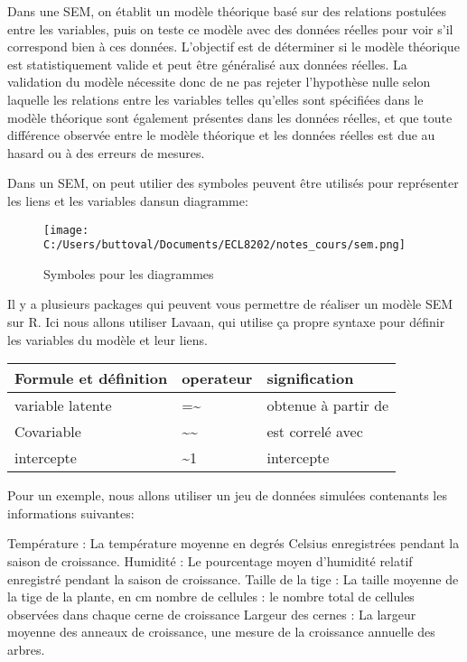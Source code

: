 \documentclass[
]{article}
\begin{document}
Dans une SEM, on établit un modèle théorique basé sur des relations
postulées entre les variables, puis on teste ce modèle avec des données
réelles pour voir s'il correspond bien à ces données. L'objectif est de
déterminer si le modèle théorique est statistiquement valide et peut
être généralisé aux données réelles. La validation du modèle nécessite
donc de ne pas rejeter l'hypothèse nulle selon laquelle les relations
entre les variables telles qu'elles sont spécifiées dans le modèle
théorique sont également présentes dans les données réelles, et que
toute différence observée entre le modèle théorique et les données
réelles est due au hasard ou à des erreurs de mesures.

Dans un SEM, on peut utilier des symboles peuvent être utilisés pour
représenter les liens et les variables dansun diagramme:

\begin{figure}
\centering
\texttt{[image: C:/Users/buttoval/Documents/ECL8202/notes\_cours/sem.png]}
\caption{Symboles pour les diagrammes}
\end{figure}

Il y a plusieurs packages qui peuvent vous permettre de réaliser un
modèle SEM sur R. Ici nous allons utiliser Lavaan, qui utilise ça propre
syntaxe pour définir les variables du modèle et leur liens.

\begin{longtable}[]{@{}lll@{}}
\toprule\noalign{}
Formule et définition & operateur & signification \\
\midrule\noalign{}
\endhead
\bottomrule\noalign{}
\endlastfoot
variable latente & =\textasciitilde{} & obtenue à partir de \\
Covariable & \textasciitilde\textasciitilde{} & est correlé avec \\
intercepte & \textasciitilde1 & intercepte \\
\end{longtable}

Pour un exemple, nous allons utiliser un jeu de données simulées
contenants les informations suivantes:

Température : La température moyenne en degrés Celsius enregistrées
pendant la saison de croissance. Humidité : Le pourcentage moyen
d'humidité relatif enregistré pendant la saison de croissance. Taille de
la tige : La taille moyenne de la tige de la plante, en cm nombre de
cellules : le nombre total de cellules observées dans chaque cerne de
croissance Largeur des cernes : La largeur moyenne des anneaux de
croissance, une mesure de la croissance annuelle des arbres.
\end{document}

